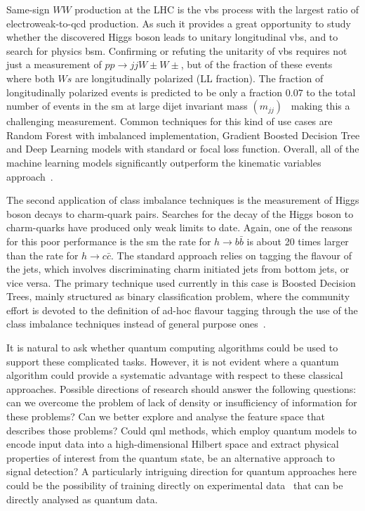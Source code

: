 Same-sign $WW$ production at the LHC is the \gls{vbs} process with the largest ratio of electroweak-to-\gls{qcd} production. As such it provides a great opportunity to study whether the discovered Higgs boson leads to unitary longitudinal \gls{vbs}, and to search for physics \gls{bsm}.
Confirming or refuting the unitarity of \gls{vbs} requires not just a measurement of $pp\to jjW\pm W\pm$, but of the fraction of these events where both $Ws$ are longitudinally polarized (LL fraction). The fraction of longitudinally polarized events is predicted to be only a fraction $ 0.07$ to the total number of events in the \gls{sm} at large dijet invariant mass $(m_{jj})$~\cite{Ballestrero_2018} making this a challenging measurement.
Common techniques for this kind of use cases are Random Forest with imbalanced implementation, Gradient Boosted Decision Tree and Deep Learning models with standard or focal loss function. Overall, all of the machine learning models significantly outperform the kinematic variables approach~\cite{Grossi_2020}. 

The second application of class imbalance techniques is the measurement of Higgs boson decays to charm-quark pairs. Searches for the decay of the Higgs boson to charm-quarks have produced only weak limits to date.
Again, one of the reasons for this poor performance is the \gls{sm} the rate for $h \to b\bar{b}$ is about 20 times larger than the rate for $h \to c\bar{c}$. 
The standard approach relies on tagging the flavour of the jets, which involves discriminating charm initiated jets from bottom jets, or vice versa.
The primary technique used currently in this case is Boosted Decision Trees, mainly structured as binary classification problem, where the community effort is devoted to the definition of ad-hoc flavour tagging through the use of the class imbalance techniques instead of general purpose ones~\cite{Aaboud_2018}.

It is natural to ask whether quantum computing algorithms could be used to support these complicated tasks. However, it is not evident where a quantum algorithm could provide a systematic advantage with respect to these classical approaches. Possible directions of research should answer the following questions: can we overcome the problem of lack of density or insufficiency of information for these problems? Can we better explore and analyse the feature space that describes those problems? Could \gls{qml} methods, which employ quantum models to encode input data into a high-dimensional Hilbert space and extract physical properties of interest from the quantum state, be an alternative approach to signal detection? A particularly intriguing direction for quantum approaches here could be the possibility of training directly on experimental data~\cite{Metodiev_2017} that can be directly analysed as quantum data.

